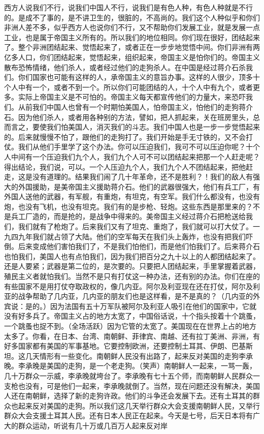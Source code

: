 西方人说我们不行，说我们中国人不行，说我们是有色人种，有色人种就是不行的。是成不了事的，是不讲卫生的，很脏的，不高尚的。我们这个人种似乎和你们非洲人差不多，似乎西方人也说你们不行，又不帮助你们发展工业，就是发展一点工业，也是属于帝国主义所有的。所以我们的地位相同。你们现在很好，团结起来了。整个非洲团结起来、觉悟起来了，或者正在一步步地觉悟中间。你们非洲有两亿多人口，你们团结起来，觉悟起来，组织起来，帝国主义是怕你们的。帝国主义散布恐怖情绪，他们杀人，或者经过他们的走狗杀人。在中国是经过蒋介石杀我们。你们国家也可能有这样的人，承帝国主义的意旨办事。这样的人很少，顶多十个人中有一个，或者不到一个。所以你们可能团结的人，十个人中有九个，或者更多。实际上帝国主义是不可怕的。帝国主义每天都宣传他们的力量大，来恐吓我们。从前我们中国人也曾有一个时期怕美国人，怕帝国主义，怕他们的走狗蒋介石。因为他们杀人，或者用各种别的方法，譬如，把人抓起来，关在班房里头，总而言之，要使我们怕美国人，消灭我们的斗志。我们中国人也是一步一步觉悟起来的。后来就慢慢不怕了，跟他们的走狗打了。我们开始是手无寸铁的，又不会打仗。我们从他们手里学了这个办法。你可以压迫我们，我可不可以压迫你呢？十个人中间有一个压迫我们九个人，我们九个人可不可以团结起来把那一个人赶走呢？得出结论，我们说，可以。一个人压迫九个人，我们九个人不团结起来，把他赶走，这是没有道理的。结果我们闹了几十年革命，还不是胜利？！我们的敌人有强大的外国援助，是美帝国主义援助蒋介石。他们的武器很强大，他们有兵工厂，有外国人送他的武器，有军舰，有重炮，有坦克，有空军。我们什么都没有，也没有炮，也没有飞机，也没有坦克。我们有的是步枪、轻炮。这些东西是那里来的？不是兵工厂造的，而是抢的，是战争中得来的。美帝国主义经过蒋介石把枪送给我们，我们就有了枪炮了。后来我们又有了坦克、重炮了，我们就可以打大仗了。一九四九年我们就占领了大陆。他们的空军每天在我们头上轰炸，也没有把我们吓倒。后来变成他们害怕我们了，不是我们怕他们，而是他们怕我们了。后来蒋介石也怕我们，美国人也有点怕我们，因为我们把百分之九十以上的人都团结起来了。还是人要紧；武器是第二位的，是次要的。只要把人团结起来，手里掌握着武器，殖民主义者就怕我们。当然不是只有打仗这一种办法，还有别的办法。你们在座的有些国家不是用打仗夺取政权的，像几内亚。阿尔及利亚现在还在打仗，阿尔及利亚的战争帮助了几内亚，几内亚的朋友们也是这样看，是不是真的？（几内亚的外宾说：是的。）因为法国有五十万军队被阿尔及利亚人吸引在他们的国家中，它就没有好多兵了。帝国主义占的地方太宽了，中国俗话说，十个指头按着十个跳蚤，一个跳蚤也捉不到。（全场活跃）因为它管的太宽了。美国现在在世界上占的地方太多了。你看，在日本、台湾、南朝鲜、菲律宾、南越、还有拉丁美洲、非洲，有好多国家都有美国的军事基地。它要控制欧洲，还要控制土耳其、伊朗、巴基斯坦。这几天情形有一些变化。南朝鲜人民没有出路了，起来反对美国的走狗李承晚。李承晚是美国的走狗，是一个老走狗。（笑声）南朝鲜人一起来，一骂一轰，几十万群众一示威，李承晚就垮台了。李承晚有七十五个师，而南朝鲜人民群众一支枪也没有，可是他们一起来，李承晚就倒了。当然，现在问题还没有解决，美国人还在南朝鲜，选择了新的走狗许政。他们的斗争还会发展下去。还有土耳其的群众也起来反对美国的走狗。所以我们这几天举行群众大会支援南朝鲜人民，又举行群众大会支援土耳其人民。还有日本人民正在起来。今天是七号，后天日本将有广大的群众运动，听说有几十万或几百万人起来反对岸